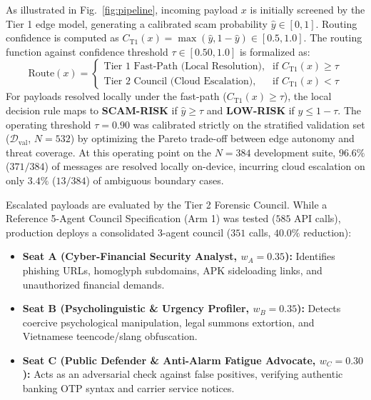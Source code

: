 As illustrated in Fig.~\ref{fig:pipeline}, incoming payload $x$ is initially screened by the Tier 1 edge model, generating a calibrated scam probability $\hat{y} \in [0, 1]$. Routing confidence is computed as $C_{\text{T1}}(x) = \max(\hat{y}, 1 - \hat{y}) \in [0.5, 1.0]$. The routing function against confidence threshold $\tau \in [0.50, 1.0]$ is formalized as:
\begin{equation}
\label{eq:routing}
\text{Route}(x) = \begin{cases}
\text{Tier 1 Fast-Path (Local Resolution)}, & \text{if } C_{\text{T1}}(x) \ge \tau \\
\text{Tier 2 Council (Cloud Escalation)}, & \text{if } C_{\text{T1}}(x) < \tau
\end{cases}
\end{equation}
For payloads resolved locally under the fast-path ($C_{\text{T1}}(x) \ge \tau$), the local decision rule maps to \textbf{SCAM-RISK} if $\hat{y} \ge \tau$ and \textbf{LOW-RISK} if $\hat{y} \le 1 - \tau$. The operating threshold $\tau = 0.90$ was calibrated strictly on the stratified validation set ($\mathcal{D}_{\text{val}}$, $N=532$) by optimizing the Pareto trade-off between edge autonomy and threat coverage. At this operating point on the $N=384$ development suite, $96.6\%$ ($371/384$) of messages are resolved locally on-device, incurring cloud escalation on only $3.4\%$ ($13/384$) of ambiguous boundary cases.

Escalated payloads are evaluated by the Tier 2 Forensic Council. While a Reference 5-Agent Council Specification (Arm 1) was tested ($585$ API calls), production deploys a consolidated 3-agent council ($351$ calls, $40.0\%$ reduction):
\begin{itemize}
    \item \textbf{Seat A (Cyber-Financial Security Analyst, $w_A = 0.35$):} Identifies phishing URLs, homoglyph subdomains, APK sideloading links, and unauthorized financial demands.
    \item \textbf{Seat B (Psycholinguistic \& Urgency Profiler, $w_B = 0.35$):} Detects coercive psychological manipulation, legal summons extortion, and Vietnamese teencode/slang obfuscation.
    \item \textbf{Seat C (Public Defender \& Anti-Alarm Fatigue Advocate, $w_C = 0.30$):} Acts as an adversarial check against false positives, verifying authentic banking OTP syntax and carrier service notices.
\end{itemize}

